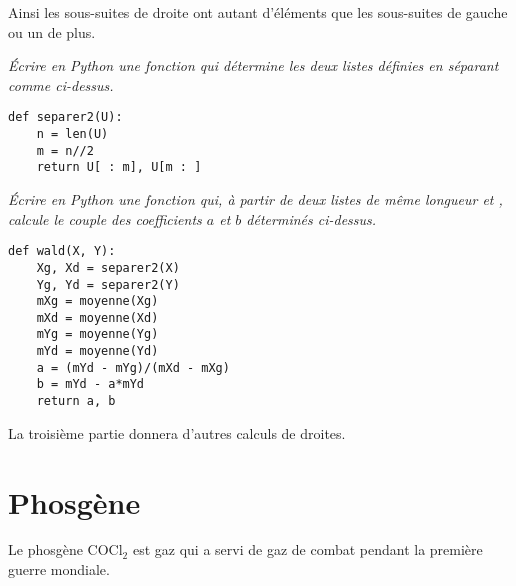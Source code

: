 Ainsi les sous-suites de droite ont autant d'éléments que les sous-suites de gauche ou un de plus.
\begin{Exercise}[title = Séparation]
\it Écrire en Python une fonction  qui détermine les deux listes définies en séparant comme ci-dessus.
\end{Exercise}
\begin{Answer}
\begin{lstlisting}
def separer2(U):
    n = len(U)
    m = n//2
    return U[ : m], U[m : ]
\end{lstlisting}
\end{Answer}
\begin{Exercise}[title = Droite de Wald]
\it Écrire en Python une fonction  qui, à partir de deux listes de même longueur  et , calcule le couple  des coefficients $a$ et $b$ déterminés ci-dessus.
\end{Exercise}
\begin{Answer}
\begin{lstlisting}
def wald(X, Y):
    Xg, Xd = separer2(X)
    Yg, Yd = separer2(Y)
    mXg = moyenne(Xg)
    mXd = moyenne(Xd)
    mYg = moyenne(Yg)
    mYd = moyenne(Yd)
    a = (mYd - mYg)/(mXd - mXg)
    b = mYd - a*mYd
    return a, b
\end{lstlisting}
\end{Answer}
\bigskip

La troisième partie donnera d'autres calculs de droites.
\newpage
\section{Phosgène} 
Le phosgène COCl${}_2$ est gaz qui a servi de gaz de combat pendant la première guerre mondiale. 

